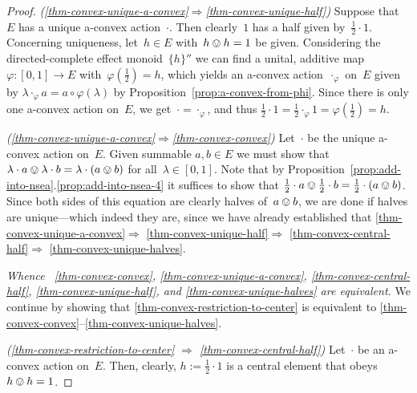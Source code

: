 \documentclass[a4paper, onecolumn, accepted=2020-12-22]{quantumarticle}
\newcommand{\mult}{\mathop{\circ}}
\theoremstyle{definition}
\begin{document}
\begin{proof}
\emph{(\ref{thm-convex-unique-a-convex}$\Rightarrow%
$\ref{thm-convex-unique-half})}
Suppose that~$E$ has a unique a-convex action~$\cdot$.
Then clearly~$1$ has a half given by~$\frac{1}{2}\cdot 1$.
Concerning uniqueness, let~$h\in E$ with~$h\ovee h=1$ be given.
Considering the directed-complete effect monoid~$\{h\}''$
  we can find a unital, additive map~$\varphi\colon [0,1]\to E$
  with~$\varphi(\frac{1}{2}) = h$,
  which yields an a-convex action~$\cdot_\varphi$ on~$E$
  given by $\lambda\cdot_\varphi a= a\mult\varphi(\lambda)$ by Proposition~\ref{prop:a-convex-from-phi}.
Since there is only one a-convex action on~$E$,
we get~$\cdot=\cdot_\varphi$, and 
thus $\frac{1}{2}\cdot 1 = \frac{1}{2}\cdot_\varphi 1 =\varphi(\frac12)= h$.


\emph{(\ref{thm-convex-unique-a-convex}$\Rightarrow%
$\ref{thm-convex-convex})}
Let~$\cdot$ be the unique a-convex action on~$E$.
Given summable $a,b\in E$ we
must show that
$\lambda\cdot a\ovee \lambda\cdot b = \lambda\cdot(a\ovee b)$
for all~$\lambda\in [0,1]$.
Note that by Proposition~\ref{prop:add-into-nsea}.\ref{prop:add-into-nsea-4}
it suffices to show that
$\frac12 \cdot a \ovee \frac12 \cdot b = \frac12\cdot (a\ovee b)$.
Since both sides of this equation
are clearly halves of~$a\ovee b$,
we are done if halves are unique---which indeed they are,
since we have already established that
\ref{thm-convex-unique-a-convex}$\Rightarrow$%
\ref{thm-convex-unique-half}$\Rightarrow$%
\ref{thm-convex-central-half}$\Rightarrow$%
\ref{thm-convex-unique-halves}.

\emph{Whence~
\ref{thm-convex-convex},
\ref{thm-convex-unique-a-convex},
\ref{thm-convex-central-half},
\ref{thm-convex-unique-half}, and 
\ref{thm-convex-unique-halves}
are equivalent.}
\noindent
We continue by showing that
\ref{thm-convex-restriction-to-center}
is equivalent to
\ref{thm-convex-convex}--\ref{thm-convex-unique-halves}.

\emph{(\ref{thm-convex-restriction-to-center}%
$\Rightarrow$%
\ref{thm-convex-central-half})}
Let~$\cdot$ be an a-convex action on~$E$.
Then, clearly, $h:=\frac{1}{2}\cdot 1$ 
is a central element
that obeys~$h\ovee h=1$.


\end{proof}
\end{document}
